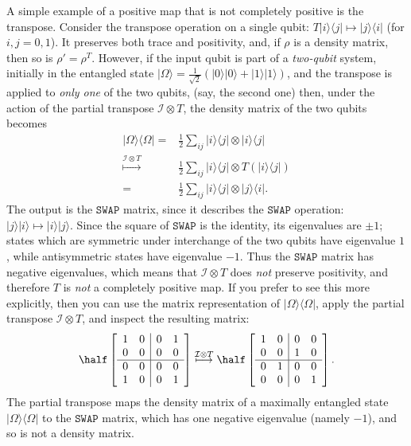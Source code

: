 \documentclass[fleqn]{article}
\begin{document}
A simple example of a positive map that is not completely positive is the transpose.
Consider the transpose operation on a single qubit: \(T|i\rangle\langle j|\mapsto|j\rangle\langle i|\) (for \(i,j=0,1\)).
It preserves both trace and positivity, and, if \(\rho\) is a density matrix, then so is \(\rho'=\rho^T\).
However, if the input qubit is part of a \emph{two-qubit} system, initially in the entangled state \(|\Omega\rangle=\frac{1}{\sqrt{2}}(|0\rangle|0\rangle+|1\rangle|1\rangle)\), and the transpose is applied to \emph{only one} of the two qubits, (say, the second one) then, under the action of the partial transpose \(\mathcal{I}\otimes T\), the density matrix of the two qubits becomes
\[
  \begin{aligned}
    |\Omega\rangle\langle\Omega|
    =& \frac12\sum_{ij} |i\rangle\langle j| \otimes|i\rangle\langle j|
  \\\overset{\mathcal{I}\otimes T}{\longmapsto}& \frac12\sum_{ij} |i\rangle\langle j| \otimes T(|i\rangle\langle j|)
  \\=& \frac12\sum_{ij} |i\rangle\langle j| \otimes|j\rangle\langle i|.
  \end{aligned}
\]
The output is the \(\texttt{SWAP}\) matrix, since it describes the \(\texttt{SWAP}\) operation: \(|j\rangle|i\rangle\mapsto|i\rangle|j\rangle\).
Since the square of \(\texttt{SWAP}\) is the identity, its eigenvalues are \(\pm1\); states which are symmetric under interchange of the two qubits have eigenvalue \(1\), while antisymmetric states have eigenvalue \(-1\).
Thus the \(\texttt{SWAP}\) matrix has negative eigenvalues, which means that \(\mathcal{I}\otimes T\) does \emph{not} preserve positivity, and therefore \(T\) is \emph{not} a completely positive map.
If you prefer to see this more explicitly, then you can use the matrix representation of \(|\Omega\rangle\langle\Omega|\), apply the partial transpose \(\mathcal{I}\otimes T\), and inspect the resulting matrix:
\[
  \half\left[
  \begin{array}{cc|cc}
    1 & 0 & 0 & 1
  \\0 & 0 & 0 & 0\\
  \hline
  0 & 0 & 0 & 0
  \\1 & 0 & 0 & 1
  \end{array}\right]
  \overset{\mathcal{I}\otimes T}{\longmapsto}
  \half\left[
  \begin{array}{cc|cc}
    1 & 0 & 0 & 0
  \\0 & 0 & 1 & 0\\
  \hline
 0 & 1 & 0 & 0
  \\0 & 0 & 0 & 1
  \end{array}\right].
\]
The partial transpose maps the density matrix of a maximally entangled state \(|\Omega\rangle\langle\Omega|\) to the \(\texttt{SWAP}\) matrix, which has one negative eigenvalue (namely \(-1\)), and so is not a density matrix.
\end{document}

